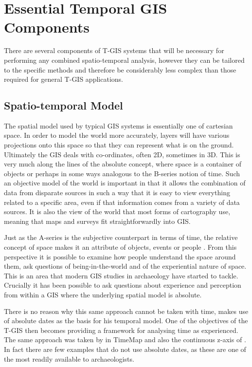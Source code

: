 \section{Essential Temporal GIS Components}
There are several components of T-GIS systems that will be necessary for performing any combined spatio-temporal analysis, however they can be tailored to the specific methods and therefore be considerably less complex than those required for general T-GIS applications.

\subsection{Spatio-temporal Model}
The spatial model used by typical GIS systems is essentially one of cartesian space. In order to model the world more accurately, layers will have various projections onto this space so that they can represent what is on the ground. Ultimately the GIS deals with co-ordinates, often 2D, sometimes in 3D. This is very much along the lines of the absolute concept, where space is a container of objects \citep{James-Conolly:2006qf} or perhaps in some ways analogous to the B-series notion of time. Such an objective model of the world is important in that it allows the combination of data from disparate sources in such a way that it is easy to view everything related to a specific area, even if that information comes from a variety of data sources. It is also the view of the world that most forms of cartography use, meaning that maps and surveys fit straightforwardly into GIS.

Just as the A-series is the subjective counterpart in terms of time, the relative concept of space makes it an attribute of objects, events or people \citep{James-Conolly:2006qf}. From this perspective it is possible to examine how people understand the space around them, ask questions of being-in-the-world and of the experiential nature of space. This is an area that modern GIS studies in archaeology have started to tackle. Crucially it has been possible to ask questions about experience and perception from within a GIS where the underlying spatial model is absolute.

There is no reason why this same approach cannot be taken with time, \citet{Green:2008fk} makes use of absolute dates as the basis for his temporal model. One of the objectives of the T-GIS then becomes providing a framework for analysing time as experienced. The same approach was taken by \citet{Johnson:1999cr} in TimeMap and also the continuous z-axis of \citet{lock2002analysing}. In fact there are few examples that do not use absolute dates, as these are one of the most readily available to archaeologists.

